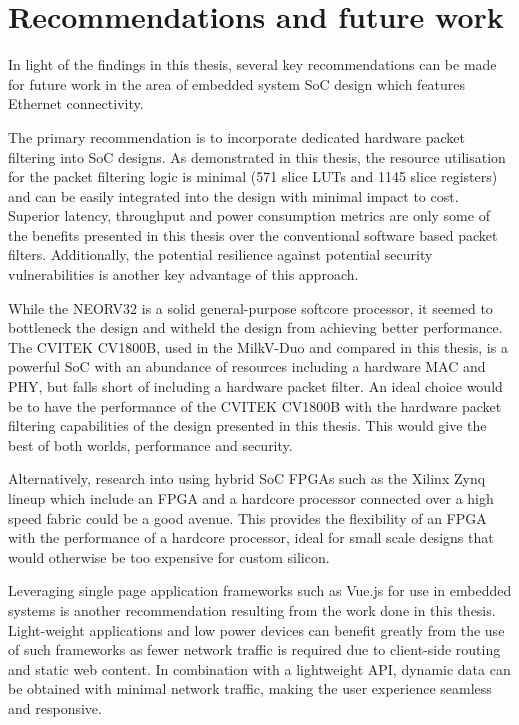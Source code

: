 \section{Recommendations and future work}

In light of the findings in this thesis, several key recommendations can be made for future work in the area of embedded system SoC design which features Ethernet connectivity.

The primary recommendation is to incorporate dedicated hardware packet filtering into SoC designs. As demonstrated in this thesis, the resource utilisation for the packet filtering logic is minimal (571 slice LUTs and 1145 slice registers) and can be easily integrated into the design with minimal impact to cost. Superior latency, throughput and power consumption metrics are only some of the benefits presented in this thesis over the conventional software based packet filters. Additionally, the potential resilience against potential security vulnerabilities is another key advantage of this approach.

While the NEORV32 is a solid general-purpose softcore processor, it seemed to bottleneck the design and witheld the design from achieving better performance. The CVITEK CV1800B, used in the MilkV-Duo and compared in this thesis, is a powerful SoC with an abundance of resources including a hardware MAC and PHY, but falls short of including a hardware packet filter. An ideal choice would be to have the performance of the CVITEK CV1800B with the hardware packet filtering capabilities of the design presented in this thesis. This would give the best of both worlds, performance and security.

Alternatively, research into using hybrid SoC FPGAs such as the Xilinx Zynq lineup which include an FPGA and a hardcore processor connected over a high speed fabric could be a good avenue. This provides the flexibility of an FPGA with the performance of a hardcore processor, ideal for small scale designs that would otherwise be too expensive for custom silicon.

Leveraging single page application frameworks such as Vue.js for use in embedded systems is another recommendation resulting from the work done in this thesis. Light-weight applications and low power devices can benefit greatly from the use of such frameworks as fewer network traffic is required due to client-side routing and static web content. In combination with a lightweight API, dynamic data can be obtained with minimal network traffic, making the user experience seamless and responsive.

